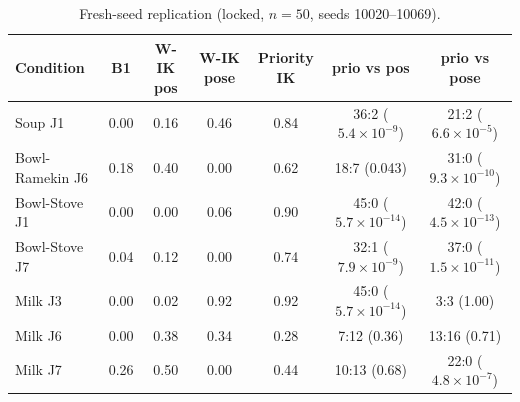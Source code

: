\begin{table}[t]
\centering
\caption{Fresh-seed replication (locked, $n{=}50$, seeds 10020--10069).}
\label{tab:n50}
\setlength{\tabcolsep}{3pt}
\begin{tabular}{lcccccc}
\toprule
Condition & B1 & W-IK pos & W-IK pose & Priority IK & prio vs pos & prio vs pose \\
\midrule
Soup J1 & 0.00 & 0.16 & 0.46 & 0.84 & 36:2 ($5.4\times10^{-9}$) & 21:2 ($6.6\times10^{-5}$) \\
Bowl-Ramekin J6 & 0.18 & 0.40 & 0.00 & 0.62 & 18:7 (0.043) & 31:0 ($9.3\times10^{-10}$) \\
Bowl-Stove J1 & 0.00 & 0.00 & 0.06 & 0.90 & 45:0 ($5.7\times10^{-14}$) & 42:0 ($4.5\times10^{-13}$) \\
Bowl-Stove J7 & 0.04 & 0.12 & 0.00 & 0.74 & 32:1 ($7.9\times10^{-9}$) & 37:0 ($1.5\times10^{-11}$) \\
Milk J3 & 0.00 & 0.02 & 0.92 & 0.92 & 45:0 ($5.7\times10^{-14}$) & 3:3 (1.00) \\
Milk J6 & 0.00 & 0.38 & 0.34 & 0.28 & 7:12 (0.36) & 13:16 (0.71) \\
Milk J7 & 0.26 & 0.50 & 0.00 & 0.44 & 10:13 (0.68) & 22:0 ($4.8\times10^{-7}$) \\
\bottomrule
\end{tabular}
\end{table}
